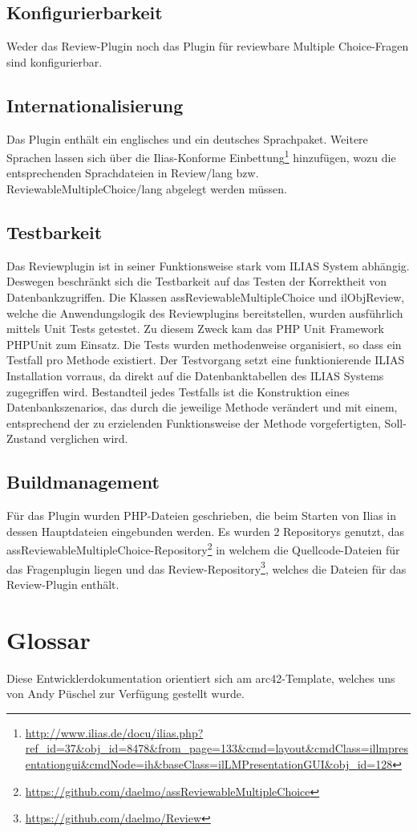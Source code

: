 \documentclass[a4paper]{scrreprt}
\begin{document}
\section{Konfigurierbarkeit}

Weder das Review-Plugin noch das Plugin für reviewbare Multiple Choice-Fragen sind konfigurierbar.

\section{Internationalisierung}

Das Plugin enthält ein englisches und ein deutsches Sprachpaket. 
Weitere Sprachen lassen sich über die Ilias-Konforme Einbettung\footnote{\url{http://www.ilias.de/docu/ilias.php?ref_id=37&obj_id=8478&from_page=133&cmd=layout&cmdClass=illmpresentationgui&cmdNode=ih&baseClass=ilLMPresentationGUI&obj_id=128}} 
 hinzufügen, wozu die entsprechenden Sprachdateien in Review/lang bzw. 
ReviewableMultipleChoice/lang abgelegt werden müssen.

\section{Testbarkeit}

Das Reviewplugin ist in seiner Funktionsweise stark vom ILIAS System abhängig. Deswegen beschränkt sich die Testbarkeit auf das Testen der Korrektheit von Datenbankzugriffen.
Die Klassen assReviewableMultipleChoice und ilObjReview, welche die Anwendungslogik des Reviewplugins bereitstellen, wurden ausführlich mittels Unit Tests getestet.
Zu diesem Zweck kam das PHP Unit Framework PHPUnit zum Einsatz. Die Tests wurden methodenweise organisiert, so dass ein Testfall pro Methode existiert.
Der Testvorgang setzt eine funktionierende ILIAS Installation vorraus, da direkt auf die Datenbanktabellen des ILIAS Systems zugegriffen wird.
Bestandteil jedes Testfalls ist die Konstruktion eines Datenbankszenarios, das durch die jeweilige Methode verändert und mit einem, entsprechend der zu erzielenden Funktionsweise der Methode vorgefertigten, Soll-Zustand verglichen wird.

\section{Buildmanagement}

Für das Plugin wurden PHP-Dateien geschrieben, die beim Starten von Ilias in dessen Hauptdateien eingebunden werden.
Es wurden 2 Repositorys genutzt, das assReviewableMultipleChoice-Repository\footnote{\url{https://github.com/daelmo/assReviewableMultipleChoice}} in welchem die Quellcode-Dateien für das Fragenplugin liegen und das Review-Repository\footnote{\url{https://github.com/daelmo/Review}}, welches die Dateien für das Review-Plugin enthält.

\chapter{Glossar}

Diese Entwicklerdokumentation orientiert sich am arc42-Template, welches uns von Andy Püschel zur Verfügung gestellt wurde.
\end{document}
